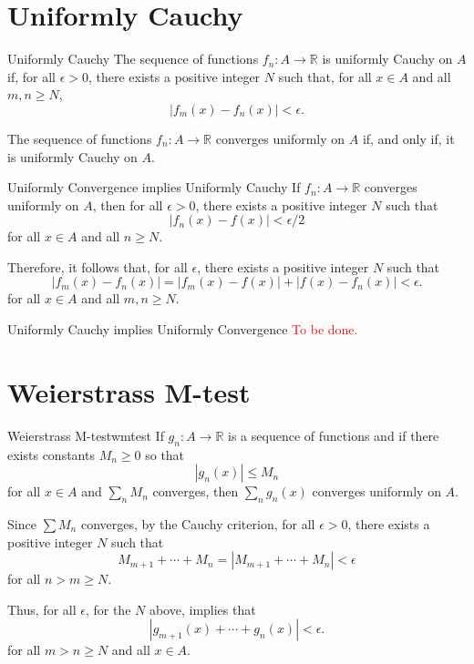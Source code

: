 
\section{Uniformly Cauchy}

\begin{defn}{Uniformly Cauchy}{}
  The sequence of functions \(f_n \colon A \to \mathbb{R}\) is uniformly Cauchy on \(A\) if, for all \(\epsilon > 0\), there exists a positive integer \(N\) such that, for all \(x \in A\) and all \(m, n \geq N\),
  \[
    |f_m(x) - f_n(x)| < \epsilon.
  \] 
\end{defn}

\begin{thm}{}{}
  The sequence of functions \(f_n \colon A \to \mathbb{R}\) converges uniformly on \(A\) if, and only if, it is uniformly Cauchy on \(A\).
\end{thm}

\begin{dem}{Uniformly Convergence implies Uniformly Cauchy}{}
  If \(f_n \colon A \to \mathbb{R}\) converges uniformly on \(A\), then for all  \(\epsilon > 0\), there exists a positive integer  \(N\) such that \[
    |f_n(x) - f(x)| < \epsilon/2
  \] 
  for all \(x \in A\) and all \(n \geq N\).

  Therefore, it follows that, for all \(\epsilon\), there exists a positive integer \(N\) such that \[
    |f_m(x) - f_n(x)| = |f_m(x) - f(x)| + |f(x) - f_n(x)| < \epsilon.
  \] 
  for all \(x \in A\) and all \(m, n \geq N\).
\end{dem}

\begin{dem}{Uniformly Cauchy implies Uniformly Convergence}{}
  \textcolor{red}{To be done.}
\end{dem}

\section{Weierstrass M-test}

\begin{thm}{Weierstrass M-test}{wmtest}
  If \(g_n \colon A \to \mathbb{R}\) is a sequence of functions and if there exists constants \(M_n \geq 0\) so that \[
    |g_n(x)| \leq M_n
  \] 
  for all \(x \in A\)
  and \(\sum_{n} M_n\) converges, then \(\sum_{n} g_n(x)\) converges uniformly on \(A\).
\end{thm}

\begin{dem}{}{}
  Since \(\sum M_n\) converges, by the Cauchy criterion, for all \(\epsilon > 0\), there exists a positive integer \(N\) such that \[
	M_{m+1} + \cdots + M_n = |M_{m+1} + \cdots + M_n| < \epsilon
  \]
  for all \(n > m \geq N\).

  Thus, for all \(\epsilon\), for the  \(N\) above, implies that \[
    |g_{m+1}(x) + \cdots + g_n(x)| < \epsilon.
  \] 
  for all \(m > n \geq N\) and all \(x \in A\).
\end{dem}

